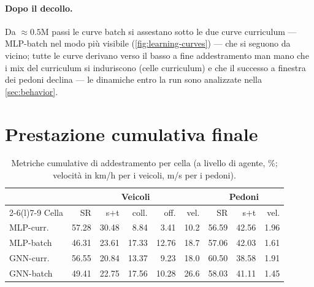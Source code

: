 \paragraph{Dopo il decollo.}
Da $\approx 0.5$M passi le curve batch si assestano sotto le due curve
curriculum --- MLP-batch nel modo più visibile
(\cref{fig:learning-curves}) --- che si seguono da vicino; tutte le
curve derivano verso il basso a fine addestramento man mano che i mix
del curriculum si induriscono (celle curriculum) e che il successo a
finestra dei pedoni declina --- le dinamiche entro la run sono
analizzate nella \cref{sec:behavior}.

\section{Prestazione cumulativa finale}
\label{sec:final-performance}

\begin{table}[t]
  \centering\small
  \caption{Metriche cumulative di addestramento per cella (a livello di
  agente, \%; velocità in km/h per i veicoli, m/s per i pedoni).}
  \label{tab:cumulative}
  \begin{tabular}{@{}lrrrrrrrr@{}}
    \toprule
    & \multicolumn{5}{c}{Veicoli} & \multicolumn{3}{c}{Pedoni} \\
    \cmidrule(lr){2-6}\cmidrule(l){7-9}
    Cella & SR & s$+$t & coll. & off. & vel. & SR & s$+$t & vel. \\
    \midrule
    MLP-curr.\ & 57.28 & 30.48 & 8.84 & 3.41 & 10.2 & 56.59 & 42.56 & 1.96 \\
    MLP-batch  & 46.31 & 23.61 & 17.33 & 12.76 & 18.7 & 57.06 & 42.03 & 1.61 \\
    GNN-curr.\ & 56.55 & 20.84 & 13.37 & 9.23 & 18.0 & 60.50 & 38.58 & 1.91 \\
    GNN-batch  & 49.41 & 22.75 & 17.56 & 10.28 & 26.6 & 58.03 & 41.11 & 1.45 \\
    \bottomrule
  \end{tabular}
\end{table}

